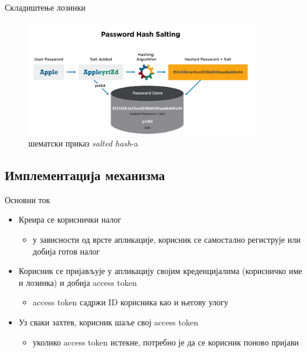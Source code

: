\documentclass{beamer}
\begin{document}
\begin{frame}[allowframebreaks]{Складиштење лозинки}
\begin{itemize}
            \framebreak
        
            \begin{figure}
                \centering
                \includegraphics[width=0.9\textwidth,height=\textheight,keepaspectratio]{images/hashsalt.png}
                \caption{шематски приказ \textit{salted hash}-a}
                \label{fig:hashsalt}
            \end{figure}
        \end{itemize}
    \end{frame}
    
    \subsection{Имплементација механизма}
    
    \begin{frame}{Основни ток}
        \begin{itemize}
            \item Креира се кориснички налог
            \begin{itemize}
                \item у зависности од врсте апликације, корисник се самостално региструје или добија готов налог
            \end{itemize}
            \item Корисник се пријављује у апликацију својим креденцијалима (корисничко име и лозинка) и добија access token
            \begin{itemize}
                \item access token садржи ID корисника као и његову улогу
            \end{itemize}
            \item Уз сваки захтев, корисник шаље свој access token
            \begin{itemize}
                \item уколико access token истекне, потребно је да се корисник поново пријави
            \end{itemize}
        \end{itemize}
    \end{frame}
    
\end{document}
